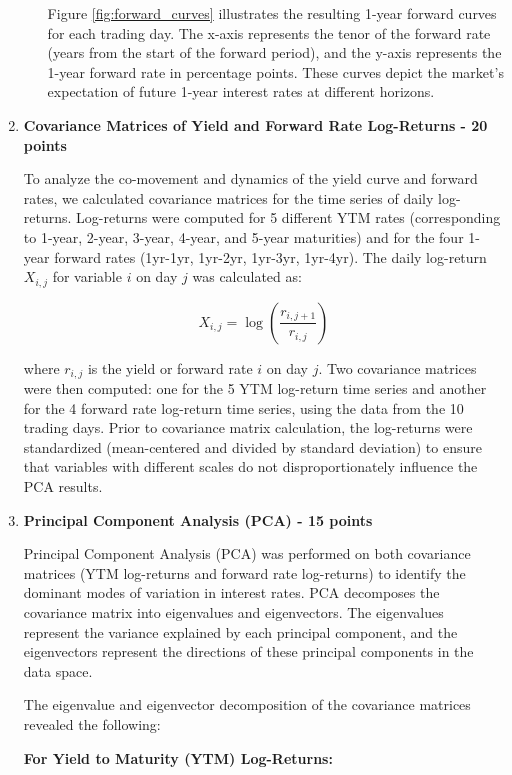 \documentclass{article}
\begin{document}
\begin{enumerate}
\begin{enumerate}
            Figure \ref{fig:forward_curves} illustrates the resulting 1-year forward curves for each trading day. The x-axis represents the tenor of the forward rate (years from the start of the forward period), and the y-axis represents the 1-year forward rate in percentage points.  These curves depict the market's expectation of future 1-year interest rates at different horizons.
    \end{enumerate}

    \item \textbf{Covariance Matrices of Yield and Forward Rate Log-Returns - 20 points}

        To analyze the co-movement and dynamics of the yield curve and forward rates, we calculated covariance matrices for the time series of daily log-returns. Log-returns were computed for 5 different YTM rates (corresponding to 1-year, 2-year, 3-year, 4-year, and 5-year maturities) and for the four 1-year forward rates (1yr-1yr, 1yr-2yr, 1yr-3yr, 1yr-4yr).  The daily log-return $X_{i,j}$ for variable $i$ on day $j$ was calculated as:

        \[
        X_{i,j} = \log\left(\frac{r_{i,j+1}}{r_{i,j}}\right)
        \]

        where $r_{i,j}$ is the yield or forward rate $i$ on day $j$.  Two covariance matrices were then computed: one for the 5 YTM log-return time series and another for the 4 forward rate log-return time series, using the data from the 10 trading days.  Prior to covariance matrix calculation, the log-returns were standardized (mean-centered and divided by standard deviation) to ensure that variables with different scales do not disproportionately influence the PCA results.

    \item \textbf{Principal Component Analysis (PCA) - 15 points}

        Principal Component Analysis (PCA) was performed on both covariance matrices (YTM log-returns and forward rate log-returns) to identify the dominant modes of variation in interest rates. PCA decomposes the covariance matrix into eigenvalues and eigenvectors. The eigenvalues represent the variance explained by each principal component, and the eigenvectors represent the directions of these principal components in the data space.

        The eigenvalue and eigenvector decomposition of the covariance matrices revealed the following:

        \textbf{For Yield to Maturity (YTM) Log-Returns:}


\end{enumerate}
\end{document}
